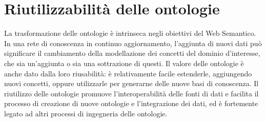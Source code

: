 \section{Riutilizzabilità delle ontologie}
\label{sec:OntoReuse}
La trasformazione delle ontologie è intrinseca negli obiettivi del Web Semantico. In una rete di conoscenza in continuo aggiornamento, l'aggiunta di nuovi dati può significare il cambiamento della modellazione dei concetti del dominio d'interesse, che sia un'aggiunta o sia una sottrazione di questi. Il valore delle ontologie è anche dato dalla loro riusabilità: è relativamente facile estenderle, aggiungendo nuovi concetti, oppure utilizzarle per generarne delle nuove basi di conoscenza. Il riutilizzo delle ontologie promuove l'interoperabilità delle fonti di dati e facilita il processo di creazione di nuove ontologie e l'integrazione dei dati, ed è fortemente legato ad altri processi di ingegneria delle ontologie.
